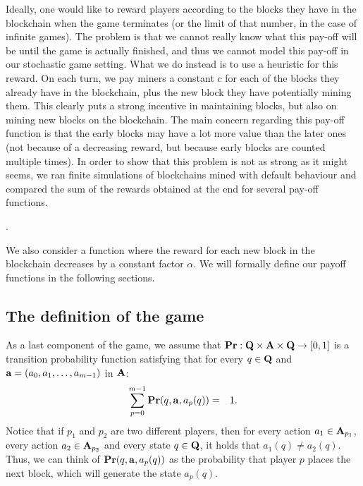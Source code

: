 Ideally, one would like to reward players according to the blocks they have in the blockchain when the game terminates (or the limit of that number, in the case of infinite games). The problem is that we cannot really know what this pay-off will be until the game is actually finished, and thus we cannot model this pay-off in our stochastic game setting. 
What we do instead is to use a heuristic for this reward. On each turn, we pay miners a constant $c$ for each of the blocks they already have in the blockchain, plus the new block they have potentially mining them. This clearly puts a strong incentive in maintaining blocks, but also on mining new blocks on the blockchain. The main concern regarding this pay-off function is that the early blocks may have a lot more value than the later ones (not because of a decreasing reward, but because early blocks are counted multiple times).
In order to show that this problem is not as strong as it might seems, we ran finite simulations of blockchains mined with default behaviour and compared the sum of the rewards obtained at the end for several pay-off functions.  


.

We also consider a function where the reward for each new block in the blockchain decreases by a constant factor $\alpha$. We will formally define our payoff functions in the following sections. 


\subsection{The definition of the game}
As a last component of the game, we assume that $\mathbf{Pr} : \mathbf{Q} \times \mathbf{A} \times \mathbf{Q} \to [0,1]$ is a transition probability function satisfying that for every $q \in \mathbf{Q}$ and $\mathbf{a} = (a_0, a_1, \ldots, a_{m-1})$ in $\mathbf{A}$:
\begin{eqnarray*}\label{eq-prop}
\sum_{p=0}^{m-1} \mathbf{Pr}(q, \mathbf{a}, a_p(q)) & = & 1.
\end{eqnarray*}
Notice that if $p_1$ and $p_2$ are two different players, then for every action $a_1 \in \mathbf{A}_{p_1}$, every action $a_2 \in \mathbf{A}_{p_2}$ and every state $q \in \mathbf{Q}$, it holds that $a_1(q) \neq a_2(q)$. Thus, we can think of $\mathbf{Pr}(q, \mathbf{a}, a_p(q))$ as the probability that player $p$ places the next block, which will generate the state $a_p(q)$. 

